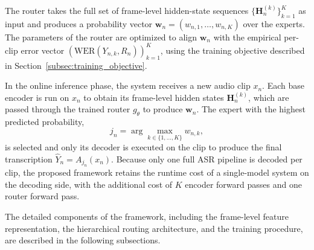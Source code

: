 \documentclass[journal]{IEEEtran}
\begin{document}
The router takes the full set of frame-level hidden-state sequences
$\{\mathbf{H}_n^{(k)}\}_{k=1}^{K}$ as input and produces a probability
vector $\mathbf{w}_n=(w_{n,1},\dots,w_{n,K})$ over the experts. The
parameters of the router are optimized to align $\mathbf{w}_n$ with
the empirical per-clip error vector $(\mathrm{WER}(Y_{n,k},R_n))_{k=1}^{K}$,
using the training objective described in
Section~\ref{subsec:training_objective}.

In the online inference phase, the system receives a new audio clip
$x_n$. Each base encoder is run on $x_n$ to obtain its frame-level
hidden states $\mathbf{H}_n^{(k)}$, which are passed through the
trained router $g_\theta$ to produce $\mathbf{w}_n$. The expert with
the highest predicted probability,
\[
j_n=\arg\max_{k\in\{1,\dots,K\}} w_{n,k},
\]
is selected and only its decoder is executed on the clip to produce
the final transcription $\hat{Y}_n = A_{j_n}(x_n)$. Because only one
full ASR pipeline is decoded per clip, the proposed framework retains
the runtime cost of a single-model system on the decoding side, with
the additional cost of $K$ encoder forward passes and one router
forward pass.

The detailed components of the framework, including the frame-level
feature representation, the hierarchical routing architecture, and
the training procedure, are described in the following subsections.
\end{document}
